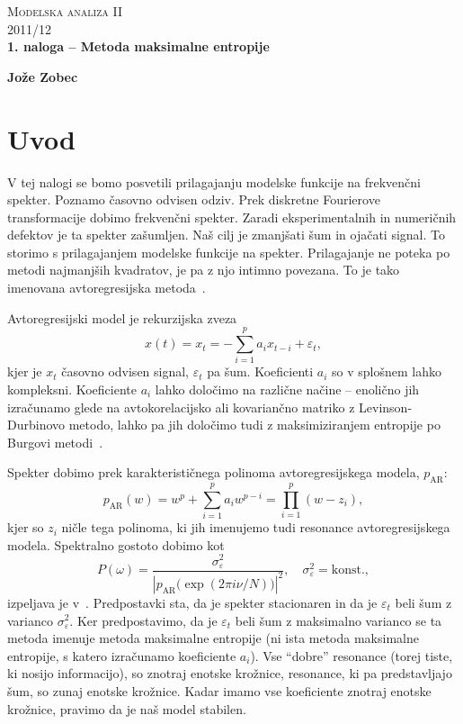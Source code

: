\documentclass[a4 paper, 12pt]{article}
\newcommand{\e}{
	\ensuremath{\varepsilon}
}
\newcommand{\w}{
	\ensuremath{\omega}
}
\begin{document}
\begin{center}
\textsc{Modelska analiza II}\\
\textsc{2011/12}\\[0.5cm]
\textbf{1. naloga -- Metoda maksimalne entropije}
\end{center}
\begin{flushright}
\textbf{Jože Zobec}\\
\end{flushright}

\section{Uvod}

V tej nalogi se bomo posvetili prilagajanju modelske funkcije na frekven\v cni spekter. Poznamo \v casovno
odvisen odziv. Prek diskretne Fourierove transformacije dobimo frekven\v cni spekter. Zaradi eksperimentalnih
in numeri\v cnih defektov je ta spekter za\v sumljen. Na\v s cilj je zmanj\v sati \v sum in oja\v cati signal.
To storimo s prilagajanjem modelske funkcije na spekter. Prilagajanje ne poteka po metodi najmanj\v sih kvadratov,
je pa z njo intimno povezana. To je tako imenovana avtoregresijska metoda~\cite[str.~302]{sirca}.

Avtoregresijski model je rekurzijska zveza
\begin{equation}
	x(t) = x_t = - \sum_{i = 1}^p a_i x_{t - i} + \e_t,
	\label{avtoregresija}
\end{equation}
kjer je $x_t$ \v casovno odvisen signal, $\e_t$ pa \v sum. Koeficienti $a_i$ so v splo\v snem lahko kompleksni.
Koeficiente $a_i$ lahko dolo\v cimo na razli\v cne na\v cine -- enoli\v cno jih izra\v cunamo glede na avtokorelacijsko
ali kovarian\v cno matriko z Levinson-Durbinovo metodo, lahko pa jih dolo\v cimo tudi z maksimiziranjem entropije po
Burgovi metodi~\cite{sirca}.

Spekter dobimo prek karakteristi\v cnega polinoma avtoregresijskega modela, $p_\mathrm{AR}$:
\begin{equation}
	p_\mathrm{AR}(w) = w^p + \sum_{i = 1}^p a_i w^{p-i} = \prod_{i = 1}^p (w - z_i),
\end{equation}
kjer so $z_i$ ni\v cle tega polinoma, ki jih imenujemo tudi resonance avtoregresijskega modela. Spektralno gostoto
dobimo kot
\begin{equation}
	P (\w) = \frac{\sigma^2_\e}{|p_\mathrm{AR}\big(\exp(2\pi i\nu/N)\big)|^2}, \quad \sigma^2_\e = \text{konst.},
	\label{spekter}
\end{equation}
izpeljava je v~\cite[str. 308-9]{sirca}.
Predpostavki sta, da je spekter stacionaren in da je $\e_t$ beli \v sum z varianco $\sigma^2_\e$. Ker predpostavimo,
da je $\e_t$ beli \v sum z maksimalno varianco se ta metoda imenuje metoda maksimalne entropije (ni ista metoda
maksimalne entropije, s katero izra\v cunamo koeficiente $a_i$). Vse "`dobre"' resonance (torej tiste, ki nosijo
informacijo), so znotraj enotske kro\v znice, resonance, ki pa predstavljajo \v sum, so zunaj enotske kro\v znice. Kadar
imamo vse koeficiente znotraj enotske kro\v znice, pravimo da je na\v s model stabilen.
\end{document}
